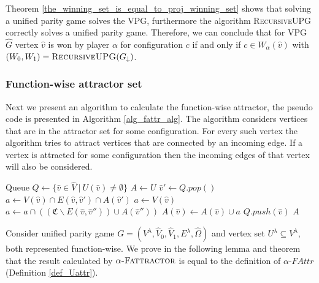 Theorem \ref{the_winning_set_is_equal_to_proj_winning_set} shows that solving a unified parity game solves the VPG, furthermore the algorithm \textsc{RecursiveUPG} correctly solves a unified parity game. Therefore, we can conclude that for VPG $\hat{G}$ vertex $\hat{v}$ is won by player $\alpha$ for configuration $c$ if and only if $c \in W_\alpha(\hat{v})$ with $(W_0,W_1) = \textsc{RecursiveUPG}(G_{\downarrow})$.

\subsubsection{Function-wise attractor set}
Next we present an algorithm to calculate the function-wise attractor, the pseudo code is presented in Algorithm \ref{alg_fattr_alg}. The algorithm considers vertices that are in the attractor set for some configuration. For every such vertex the algorithm tries to attract vertices that are connected by an incoming edge. If a vertex is attracted for some configuration then the incoming edges of that vertex will also be considered.
\begin{algorithm}
	\caption{$\textsc{$\alpha$-FAttractor}(G, U : \hat{V} \rightarrow 2^\mathfrak{C})$}\label{alg_fattr_alg}
	\begin{algorithmic}[1]
		\State Queue $Q \gets \{\hat{v} \in \hat{V} \ |\ U(\hat{v}) \neq \emptyset  \}$
		\State $A \gets U$
		\State $\hat{v}' \gets Q.pop()$
				\State $a \gets V(\hat{v}) \cap E(\hat{v},\hat{v}') \cap A(\hat{v}')$
			\Else
				\State $a \gets V(\hat{v})$
					\State $a \gets a \cap ((\mathfrak{C}\backslash E(\hat{v},\hat{v}'')) \cup A(\hat{v}''))$
				\EndFor
			\EndIf
				\State $A(\hat{v}) \gets A(\hat{v}) \cup a$
				\State $Q.push(\hat{v})$
			\EndIf
		\EndFor
		\EndWhile
		\State \Return $A$
	\end{algorithmic}
\end{algorithm}

Consider unified parity game $G = (V^\lambda,\hat{V}_0,\hat{V}_1,E^\lambda,\hat{\Omega})$ and vertex set $U^\lambda \subseteq V^\lambda$, both represented function-wise. We prove in the following lemma and theorem that the result calculated by $\alpha\textsc{-Fattractor}$ is equal to the definition of $\alpha\textit{-FAttr}$ (Definition \ref{def_Uattr}). 

